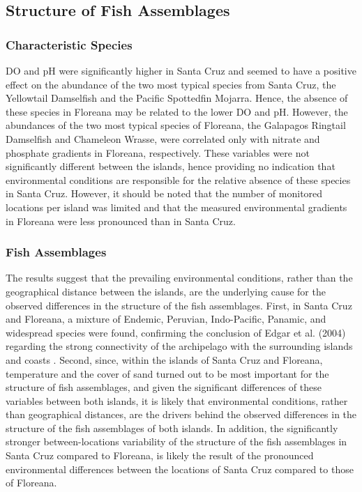 \documentclass[jmse,article,accept,moreauthors,pdftex]{Definitions/mdpi}
\begin{document}
\begin{paracol}{2}
\subsection{Structure of Fish Assemblages}

\subsubsection{Characteristic Species}

DO and pH were significantly higher in Santa Cruz and seemed to have a positive effect on the abundance of the two most typical species from Santa Cruz, the Yellowtail Damselfish and the Pacific Spottedfin Mojarra. Hence, the absence of these species in Floreana may be related to the lower DO and pH. However, the abundances of the two most typical species of Floreana, the Galapagos Ringtail Damselfish and Chameleon Wrasse, were correlated only with nitrate and phosphate gradients in Floreana, respectively. These variables were not significantly different between the islands, hence providing no indication that environmental conditions are responsible for the relative absence of these species in Santa Cruz. However, it should be noted that the number of monitored locations per island was limited and that the measured environmental gradients in Floreana were less pronounced than in Santa Cruz.

\subsubsection{Fish Assemblages}

The results suggest that the prevailing environmental conditions, rather than the geographical distance between the islands, are the underlying cause for the observed differences in the structure of the fish assemblages. First, in Santa Cruz and Floreana, a mixture of Endemic, Peruvian, Indo-Pacific, Panamic, and widespread species were found, confirming the conclusion of Edgar et al. (2004) regarding the strong connectivity of the archipelago with the surrounding islands and coasts \citep{Edgar2004}. Second, since, within the islands of Santa Cruz and Floreana, temperature and the cover of sand turned out to be most important for the structure of fish assemblages, and given the significant differences of these variables between both islands, it is likely that environmental conditions, rather than geographical distances, are the drivers behind the observed differences in the structure of the fish assemblages of both islands. In addition, the significantly stronger between-locations variability of the structure of the fish assemblages in Santa Cruz compared to Floreana, is likely the result of the pronounced environmental differences between the locations of Santa Cruz compared to those of Floreana. %


\end{paracol}
\end{document}
